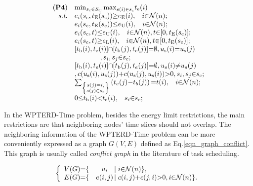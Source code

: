 \documentclass[journal,10pt]{IEEEtran}
\begin{document}
\begin{equation}
\label{eqn_wpterd_time}
\begin{array}{rl}
(\textbf{P4})&\mathop{\min}_{s_\text{c}{\in}S_\text{C}}{\max}_{s(i){\in}s_\text{c}}t_\text{e}(i)\\
\textit{s.t.}&e_i(s_\text{c},t_\text{E}(s_\text{c})){\geq}e_\text{E}(i),\hspace{3mm}i{\in}\mathcal{N}(n);\\
&e_i(s_\text{c},t_\text{E}(s_\text{c})){\leq}e_\text{U}(i),\hspace{3mm}i{\in}\mathcal{N}(n);\\
&e_i(s_\text{c},t){\leq}e_\text{U}(i),\hspace{3mm}i{\in}\mathcal{N}(n),t{\in}[0,t_\text{E}(s_\text{c})];\\
&e_i(s_\text{c},t){\geq}e_\text{L}(i),\hspace{3mm}i{\in}\mathcal{N}(n),t{\in}[0,t_\text{E}(s_\text{c})];\\
&[t_\text{b}(i),t_\text{e}(i)]{\cap}[t_\text{b}(j),t_\text{e}(j)]{=}\emptyset,u_\text{s}(i){=}u_\text{s}(j)\\
&\hspace{13mm},s_i,s_j{\in}s_c;\\
&[t_\text{b}(i),t_e(i)]{\cap}[t_\text{b}(j),t_e(j)]{=}\emptyset,u_s(i){\neq}u_s(j)\\
&,c(u_\text{s}(i),u_\text{s}(j)){+}c(u_\text{s}(j),u_\text{s}(i)){>}0,s_i,s_j{\in}s_\text{c};\\
&\sum_{\left\{\substack{s(j){=}i,\\s(j){\in}s_\text{c}}\right\}}\left(t_e(j){-}t_b(j)\right){=}t(i),\hspace{3mm}i{\in}\mathcal{N}(n);\\
&0{\leq}t_\text{b}(i){<}t_\text{e}(i),\hspace{3mm}s_i{\in}s_\text{c};
\end{array}
\end{equation}

In the WPTERD-Time problem, besides the energy limit restrictions, the main restrictions are that neighboring nodes' time slices should not overlap. The neighboring information of the WPTERD-Time problem can be more conveniently expressed as a graph $G(V,E)$ defined as Eq.\eqref{eqn_graph_conflict}. This graph is usually called \textit{conflict graph} in the literature of task scheduling.

\begin{equation}
\label{eqn_graph_conflict}
\left\{
\begin{array}{lcll}
V(G){=}\{&u_i\hspace{-3mm}&|\hspace{1mm}i{\in}\mathcal{N}(n)\},\\
E(G){=}\{&e(i,j)\hspace{-3mm}&|\hspace{1mm}c(i,j){+}c(j,i){>}0,i{\in}\mathcal{N}(n)\}.\\
\end{array}
\right.
\end{equation}
\end{document}
